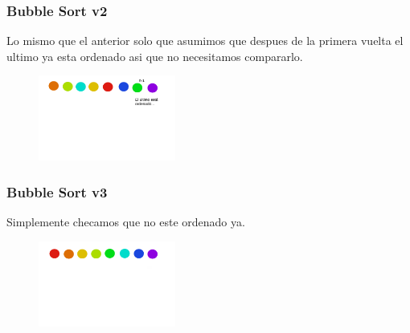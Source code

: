 \documentclass[12pt, fleqn]{report}                             %
\theoremstyle{break}                                            %
\begin{document}
        \subsubsection{Bubble Sort v2}
        Lo mismo que el anterior solo que asumimos que despues de la primera vuelta el ultimo ya esta ordenado asi que no necesitamos compararlo.
        \begin{figure}[h]
                        \centering
                        \includegraphics[width=0.4\textwidth]{graphics/Burbuja2-3.png}
                    \end{figure}
                    
        \subsubsection{Bubble Sort v3}
        Simplemente checamos que no este ordenado ya.
        
        \begin{figure}[h]
                        \centering
                        \includegraphics[width=0.4\textwidth]{graphics/Ordenados.png}
                    \end{figure}
\end{document}
